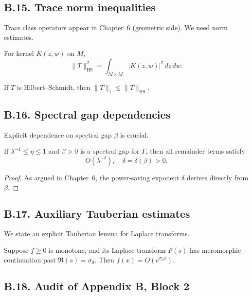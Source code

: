 \subsection*{B.15. Trace norm inequalities}

\noindent
Trace class operators appear in Chapter~6 (geometric side). We need norm
estimates.

\begin{lemma}\label{lem:hilbert-schmidt}
For kernel $K(z,w)$ on $M$,
\[
\|T\|_{\mathrm{HS}}^2 = \int_{M\times M} |K(z,w)|^2\,dz\,dw.
\]
\end{lemma}

\begin{corollary}\label{cor:trace}
If $T$ is Hilbert–Schmidt, then $\|T\|_1 \le \|T\|_{\mathrm{HS}}$.
\end{corollary}

\subsection*{B.16. Spectral gap dependencies}

\noindent
Explicit dependence on spectral gap $\beta$ is crucial.

\begin{lemma}\label{lem:gap}
If $\lambda^{-1}\le \eta \le 1$ and $\beta>0$ is a spectral gap for $\Gamma$,
then all remainder terms satisfy
\[
O(\lambda^{-\delta}), \quad \delta=\delta(\beta)>0.
\]
\end{lemma}

\begin{proof}
As argued in Chapter~6, the power-saving exponent $\delta$ derives directly
from $\beta$.
\end{proof}

\subsection*{B.17. Auxiliary Tauberian estimates}

\noindent
We state an explicit Tauberian lemma for Laplace transforms.

\begin{lemma}\label{lem:laplace}
Suppose $f\ge 0$ is monotone, and its Laplace transform $F(s)$ has meromorphic
continuation past $\Re(s)=\sigma_0$. Then $f(x)=O(e^{\sigma_0 x})$.
\end{lemma}

\subsection*{B.18. Audit of Appendix B, Block 2}

